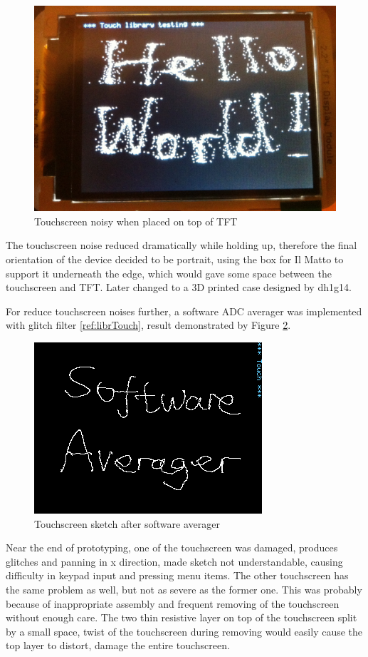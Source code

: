\documentclass[a4paper,notitlepage,10pt]{report}
\begin{document}
\begin{multicols}{2}
\begin{figure}[H]
	\centering
	\includegraphics[width=0.6\columnwidth]{photo_ts_noisy}
	\caption{Touchscreen noisy when placed on top of TFT}
	\label{fig:photoTSNoisy}
\end{figure}
\vspace{6pt}

The touchscreen noise reduced dramatically while holding up, therefore the final orientation of the device decided to be portrait, using the box for Il Matto to support it underneath the edge, which would gave some space between the touchscreen and TFT. Later changed to a 3D printed case designed by dh1g14.
\vspace{6pt}

For reduce touchscreen noises further, a software ADC averager was implemented with glitch filter \ref{ref:librTouch}, result demonstrated by Figure \ref{fig:capTSAvg}.
\vspace{6pt}

\begin{figure}[H]
	\centering
	\includegraphics[width=0.6\columnwidth]{cap_ts_avg}
	\caption{Touchscreen sketch after software averager}
	\label{fig:capTSAvg}
\end{figure}
\vspace{6pt}

Near the end of prototyping, one of the touchscreen was damaged, produces glitches and panning in x direction, made sketch not understandable, causing difficulty in keypad input and pressing menu items. The other touchscreen has the same problem as well, but not as severe as the former one. This was probably because of inappropriate assembly and frequent removing of the touchscreen without enough care. The two thin resistive layer on top of the touchscreen split by a small space, twist of the touchscreen during removing would easily cause the top layer to distort, damage the entire touchscreen.
\vspace{6pt}


\end{multicols}
\end{document}
